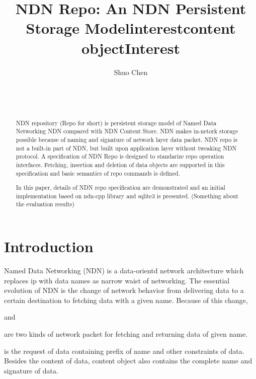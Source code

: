 \documentclass{acm_proc_article-sp}
\begin{document}
\title{NDN Repo: An NDN Persistent Storage Model}


\author{
\alignauthor
Shuo Chen\\
	\\
	\\
	\\
}
\maketitle

\begin{abstract}
NDN repository (Repo for short) is persistent storage model of Named Data Networking NDN compared with NDN Content Store. NDN makes in-netork storage possible because of naming and signature of network layer data packet. NDN repo is not a built-in part of NDN, but built upon application layer without tweaking NDN protocol. A specification of NDN Repo is designed to standarize repo operation interfaces. Fetching, insertion and deletion of data objects are supported in this specification and basic semantics of repo commands is defined.

In this paper, details of NDN repo specification are demonstrated and an initial implementation based on ndn-cpp library and sqlite3 is presented. (Something about the evaluation results)
\end{abstract}

\section{Introduction}
Named Data Networking (NDN) \cite{zhang2010named} is a data-orientd network architecture which replaces ip with data names as narrow waist of networking. The essential evolution of NDN is the change of network behavior from delivering data to a certain destination to fetching data with a given name. \cite{zhang2010named} Because of this change, \title{interest} and \title{content object} are two kinds of network packet for fetching and returning data of given name. \title{Interest} is the request of data containing prefix of name and other constraints of data. Besides the content of data, content object also contains the complete name and signature of data.
\end{document}
